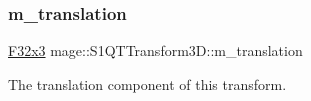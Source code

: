 \subsubsection{\texorpdfstring{m\+\_\+translation}{m\_translation}}
{\footnotesize\ttfamily \mbox{\hyperlink{namespacemage_a1e3c7a882af461f161caa1cbddaf1fa2}{F32x3}} mage\+::\+S1\+Q\+T\+Transform3\+D\+::m\+\_\+translation\hspace{0.3cm}{\ttfamily [private]}}

The translation component of this transform. 